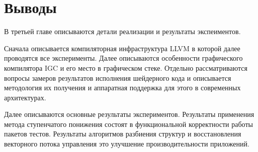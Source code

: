 \section{Выводы}\label{sec:results/outcome}

В третьей главе описываются детали реализации и результаты экспеиментов.

Сначала описывается компиляторная инфраструктура LLVM в которой далее проводятся все эксперименты. Далее описываются особенности графического компилятора IGC и его место в графическом стеке. Отдельно рассматриваются вопросы замеров результатов исполнения шейдерного кода и описывается методология их получения и аппаратная поддержка для этого в современных архитектурах.

Далее описываются основные результаты экспериментов. Результаты применения метода ступенчатого понижения состоят в функциональной корректности работы пакетов тестов. Результаты алгоритмов разбиения структур и восстановления векторного потока управления это улучшение производительности приложений.

\FloatBarrier